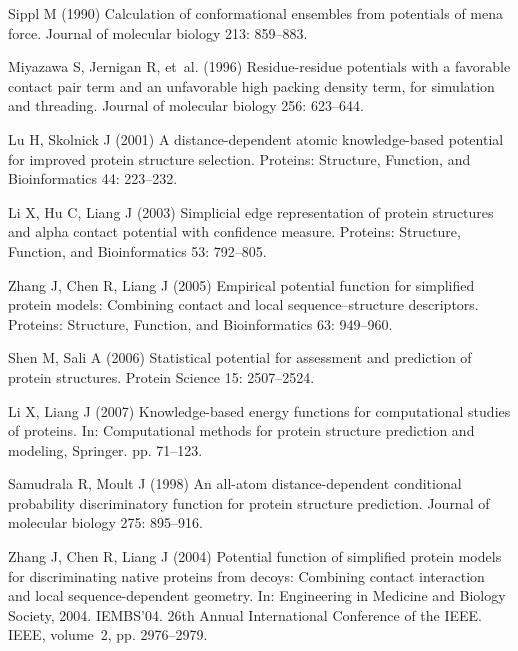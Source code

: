 \begin{thebibliography}{10}
Sippl M (1990) Calculation of conformational ensembles from
potentials of mena
  force.
\newblock Journal of molecular biology 213: 859--883.

Miyazawa S, Jernigan R, et~al. (1996) Residue-residue potentials
with a
  favorable contact pair term and an unfavorable high packing density term, for
  simulation and threading.
\newblock Journal of molecular biology 256: 623--644.

Lu H, Skolnick J (2001) A distance-dependent atomic knowledge-based
potential
  for improved protein structure selection.
\newblock Proteins: Structure, Function, and Bioinformatics 44: 223--232.

Li X, Hu C, Liang J (2003) Simplicial edge representation of protein
structures
  and alpha contact potential with confidence measure.
\newblock Proteins: Structure, Function, and Bioinformatics 53: 792--805.

Zhang J, Chen R, Liang J (2005) Empirical potential function for
simplified
  protein models: Combining contact and local sequence--structure descriptors.
\newblock Proteins: Structure, Function, and Bioinformatics 63: 949--960.

Shen M, Sali A (2006) Statistical potential for assessment and
prediction of
  protein structures.
\newblock Protein Science 15: 2507--2524.

Li X, Liang J (2007) Knowledge-based energy functions for
computational studies
  of proteins.
\newblock In: Computational methods for protein structure prediction and
  modeling, Springer. pp. 71--123.

Samudrala R, Moult J (1998) An all-atom distance-dependent
conditional
  probability discriminatory function for protein structure prediction.
\newblock Journal of molecular biology 275: 895--916.

Zhang J, Chen R, Liang J (2004) Potential function of simplified
protein models
  for discriminating native proteins from decoys: Combining contact interaction
  and local sequence-dependent geometry.
\newblock In: Engineering in Medicine and Biology Society, 2004. IEMBS'04. 26th
  Annual International Conference of the IEEE. IEEE, volume~2, pp. 2976--2979.


\end{thebibliography}
